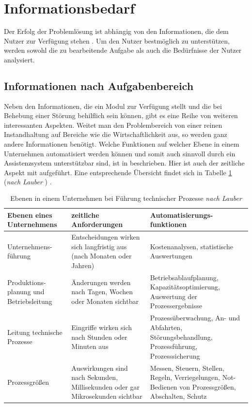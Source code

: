 \section{Informationsbedarf}
Der Erfolg der Problemlösung ist abhängig von den Informationen, die dem Nutzer zur Verfügung stehen \cite{Funke2015}. Um den Nutzer bestmöglich zu unterstützen, werden sowohl die zu bearbeitende Aufgabe als auch die Bedürfnisse der Nutzer analysiert.

\subsection{Informationen nach Aufgabenbereich}
Neben den Informationen, die ein Modul zur Verfügung stellt und die bei Behebung einer Störung behilflich sein können, gibt es eine Reihe von weiteren interessanten Aspekten. Weitet man den Problembereich von einer reinen Instandhaltung auf Bereiche wie die Wirtschaftlichkeit aus, so werden ganz andere Informationen benötigt. Welche Funktionen auf welcher Ebene in einem Unternehmen automatisiert werden können und somit auch sinnvoll durch ein Assistenzsystem unterstützbar sind, ist in \cite{Lauber1999}  beschrieben. Hier ist auch der zeitliche Aspekt mit aufgeführt. Eine entsprechende Übersicht findet sich in Tabelle \ref{tab:Ebenen-Unternehmen} (\textit{nach Lauber}  \citep{Lauber1999}) .
\begin{table}[htb]
\centering
\caption[]{Ebenen in einem Unternehmen bei Führung technischer Prozesse \textit{nach Lauber} \citep{Lauber1999}}
\label{tab:Ebenen-Unternehmen}
\begin{tabular}{|p{}|p{}|p{}|}
\hline
\textbf{Ebenen eines Unternehmens} & \textbf{zeitliche Anforderungen} & \textbf{Automatisierungs-funktionen} \\
\hline
Unternehmens-führung & Entscheidungen wirken sich langfristig aus (nach Monaten oder Jahren) & Kostenanalysen, statistische Auswertungen \\
\hline
Produktions-planung und Betriebsleitung & Änderungen werden nach Tagen, Wochen oder Monaten sichtbar & Betriebsablaufplanung, Kapazitätsoptimierung, Auswertung der Prozessergebnisse \\
\hline
Leitung technische Prozesse & Eingriffe wirken sich nach Stunden oder Minuten aus & Prozessüberwachung, An- und Abfahrten, Störungsbehandlung, Prozessführung, Prozesssicherung \\
\hline
Prozessgrößen & Auswirkungen sind nach Sekunden, Millisekunden oder gar Mikrosekunden sichtbar & Messen, Steuern, Stellen, Regeln, Verriegelungen, Not-Bedienen von Prozessgrößen, Abschalten, Schutz \\
\hline
\end{tabular}
\end{table}

